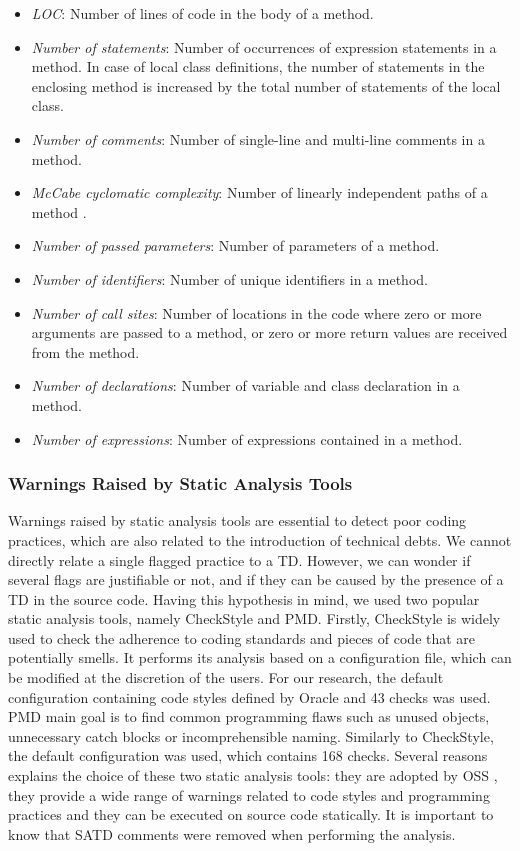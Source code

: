 \begin{itemize}
\item \textit{LOC}: Number of lines of code in the body of a method. %
\item \textit{Number of statements}: Number of occurrences of expression statements in a method. In case of local class definitions, the number of statements in the enclosing method is increased by the total number of statements of the local class.
\item \textit{Number of comments}: Number of single-line and multi-line comments in a method.
\item \textit{McCabe cyclomatic complexity}: Number of linearly independent paths of a method \citep{mccabe90}.
\item \textit{Number of passed parameters}: Number of parameters of a method.
\item \textit{Number of identifiers}: Number of unique identifiers in a method.
\item \textit{Number of call sites}: Number of locations in the code where zero or more arguments are passed to a method, or zero or more return values are received from the method.
\item \textit{Number of declarations}: Number of variable and class declaration in a method.
\item \textit{Number of expressions}: Number of expressions contained in a method.
\end{itemize}

\subsubsection{Warnings Raised by Static Analysis Tools}

Warnings raised by static analysis tools are essential to detect poor coding practices, which are also related to the introduction of technical debts. We cannot directly relate a single flagged practice to a \ac{TD}. However, we can wonder if several flags are justifiable or not, and if they can be caused by the presence of a \ac{TD} in the source code. Having this hypothesis in mind, we used two popular static analysis tools, namely CheckStyle and PMD. Firstly, CheckStyle \citep{checkstyle} is widely used to check the adherence to coding standards and pieces of code that are potentially smells. It performs its analysis based on a configuration file, which can be modified at the discretion of the users. For our research, the default configuration containing code styles defined by Oracle and 43 checks was used. PMD \citep{pmd} main goal is to find common programming flaws such as unused objects, unnecessary catch blocks or incomprehensible naming. Similarly to CheckStyle, the default configuration was used, which contains 168 checks. Several reasons explains the choice of these two static analysis tools: they are adopted by \ac{OSS} \citep{BellerBMZ16}, they provide a wide range of warnings related to code styles and programming practices and they can be executed on source code statically. It is important to know that \ac{SATD} comments were removed when performing the analysis.


